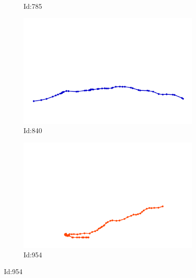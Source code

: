 \documentclass[12pt,twoside]{report}
\begin{document}
\begin{figure}
\begin{subfigure}[b]{0.20\textwidth}
\caption{Id:785}
\end{subfigure}
\begin{subfigure}[b]{0.20\textwidth}
\centering
\includegraphics[width=\textwidth]{../trajectories/840.png}
\caption{Id:840}
\end{subfigure}
\begin{subfigure}[b]{0.20\textwidth}
\centering
\includegraphics[width=\textwidth]{../trajectories/954.png}
\caption{Id:954}
\end{subfigure}
\end{figure}
\end{document}
